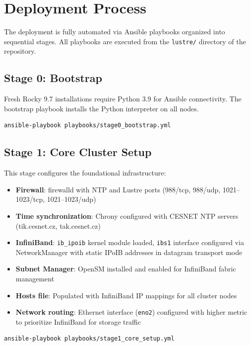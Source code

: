 \section{Deployment Process}

The deployment is fully automated via Ansible playbooks organized into sequential stages. All playbooks are executed from the \texttt{lustre/} directory of the repository.

\subsection{Stage 0: Bootstrap}

Fresh Rocky 9.7 installations require Python 3.9 for Ansible connectivity. The bootstrap playbook installs the Python interpreter on all nodes.

\begin{verbatim}
ansible-playbook playbooks/stage0_bootstrap.yml
\end{verbatim}

\subsection{Stage 1: Core Cluster Setup}

This stage configures the foundational infrastructure:

\begin{itemize}
    \item \textbf{Firewall}: firewalld with NTP and Lustre ports (988/tcp, 988/udp, 1021--1023/tcp, 1021--1023/udp)
    \item \textbf{Time synchronization}: Chrony configured with CESNET NTP servers (tik.cesnet.cz, tak.cesnet.cz)
    \item \textbf{InfiniBand}: \texttt{ib\_ipoib} kernel module loaded, \texttt{ibs1} interface configured via NetworkManager with static IPoIB addresses in datagram transport mode
    \item \textbf{Subnet Manager}: OpenSM installed and enabled for InfiniBand fabric management
    \item \textbf{Hosts file}: Populated with InfiniBand IP mappings for all cluster nodes
    \item \textbf{Network routing}: Ethernet interface (\texttt{eno2}) configured with higher metric to prioritize InfiniBand for storage traffic
\end{itemize}

\begin{verbatim}
ansible-playbook playbooks/stage1_core_setup.yml
\end{verbatim}


